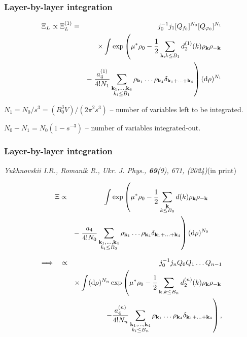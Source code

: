 \documentclass[8pt]{beamer}
\begin{document}
	\begin{frame}
		\frametitle{Layer-by-layer integration}
		
		\begin{eqnarray*}
			\Xi_L \propto \Xi_L^{(1)} & = & j_0^{-1}j_1 [Q_{f_0}]^{N_0} [Q_{\varphi_0}]^{N_1} 
			\\
			&& \times 
			\int \exp
			\left(
			\mu^*\rho_0 - \frac{1}{2} \sum_{\vb k, k \leq B_1} d_2^{(1)}(k) \rho_{\vb k} \rho_{-\vb k}
			\right.
			\nonumber \\
			&& -  
			\left.
			\frac{a_4^{(1)}}{4!N_1} \sum_{\substack{\vb k_1, \dotsc, \vb k_4 \\ k_i \leq B_1}}
			\rho_{\vb k_1} \dotsc \rho_{\vb k_4} \delta_{\vb{k}_1 + \dotsc + \vb{k}_4}
			\right) ({\rm d} \rho)^{N_1}
			\nonumber
		\end{eqnarray*}
		\hfill
		
		$N_1 = N_0 / s^3 = (B_0^3 V)/(2\pi^2 s^3)$ -- number of variables left to be integrated.
		\hfill
		\\
		\hfill
		
		$N_0 - N_1 = N_0(1-s^{-3})$ -- number of variables integrated-out.
	\end{frame}
	
	\begin{frame}
		\frametitle{Layer-by-layer integration}
		
		\textit{Yukhnovskii I.R., Romanik R., Ukr. J. Phys., {\bf 69}(9), 671, (2024)}(in print)
		
		\begin{eqnarray*}
			\label{Xi_L_1}
			\Xi &\propto & 
			\int \exp\left(
			\mu^* \rho_0 - \frac{1}{2} \sum_{\substack{\vb k \\ k \leq B_0}} d(k) \rho_{\vb k} \rho_{-\vb k} 
			\right.\\
			&& -\left. \frac{a_4}{4! N_0} \sum_{\substack{\vb k_1, \dotsc, \vb k_4 \\ k_i \leq B_0}} \rho_{\vb k_1} \dotsc \rho_{\vb k_4} \delta_{\vb{k}_1 + \dotsc + \vb{k}_4} \right) ({\rm d} \rho)^{N_0}
			\nonumber
		\end{eqnarray*}
		
		\begin{eqnarray*}
			\Longrightarrow \quad
			&\propto & j_0^{-1}j_n Q_0 Q_1 \dotsc Q_{n-1} 
			\\
			&& \times 
			\int ({\rm d} \rho)^{N_n} \exp
			\left(
			\mu^*\rho_0 - \frac{1}{2} \sum_{\vb k, k \leq B_n} d_2^{(n)}(k) \rho_{\vb k} \rho_{-\vb k}
			\right.
			\nonumber \\
			&& 
			\left.
			- \frac{a_4^{(n)}}{4!N_n} \sum_{\substack{\vb k_1, \dotsc, \vb k_4 \\ k_i \leq B_n}}
			\rho_{\vb k_1} \dotsc \rho_{\vb k_4} \delta_{\vb{k}_1 + \dotsc + \vb{k}_4}
			\right)
			\nonumber ,
		\end{eqnarray*}
	\end{frame}
	
\end{document}

